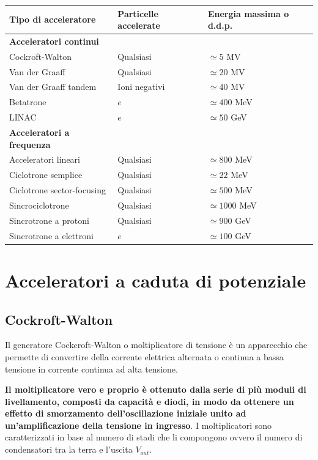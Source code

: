 \documentclass[a4paper,11pt,twoside,openany]{book}
\theoremstyle{definition}
\theoremstyle{plain}
\theoremstyle{plain}
\theoremstyle{definition}
\begin{document}
\begin{center}\begin{tabularx}{\textwidth}{lXX}
\toprule
Tipo di acceleratore & Particelle accelerate & Energia massima o d.d.p.\\
\midrule
\textbf{Acceleratori continui} &  & \\
Cockroft-Walton & Qualsiasi & $\simeq 5$ MV\\
Van der Graaff & Qualsiasi & $\simeq 20$ MV\\
Van der Graaff tandem & Ioni negativi & $\simeq 40$ MV\\
Betatrone & $e$ & $\simeq 400$ MeV\\
LINAC & $e$ & $\simeq 50$ GeV\\
\midrule
\textbf{Acceleratori a frequenza} &  & \\
Acceleratori lineari & Qualsiasi & $\simeq 800$ MeV\\
Ciclotrone semplice & Qualsiasi & $\simeq 22$ MeV\\
Ciclotrone sector-focusing & Qualsiasi & $\simeq 500$ MeV\\
Sincrociclotrone & Qualsiasi & $\simeq 1000$ MeV\\
Sincrotrone a protoni & Qualsiasi & $\simeq 900$ GeV\\
Sincrotrone a elettroni & $e$ & $\simeq 100$ GeV\\
\bottomrule
\end{tabularx}\end{center}

\section{Acceleratori a caduta di potenziale} %
\subsection{Cockroft-Walton} %
Il generatore Cockcroft-Walton o moltiplicatore di tensione è un apparecchio che permette di convertire della corrente elettrica alternata o continua a bassa tensione in corrente continua ad alta tensione.

\textbf{Il moltiplicatore vero e proprio è ottenuto dalla serie di più moduli di livellamento, composti da capacità e diodi, in modo da ottenere un effetto di smorzamento dell'oscillazione iniziale unito ad un'amplificazione della tensione in ingresso}. I moltiplicatori sono caratterizzati in base al numero di stadi che li compongono ovvero il numero di condensatori tra la terra e l'uscita $V_{out}$.
\end{document}
